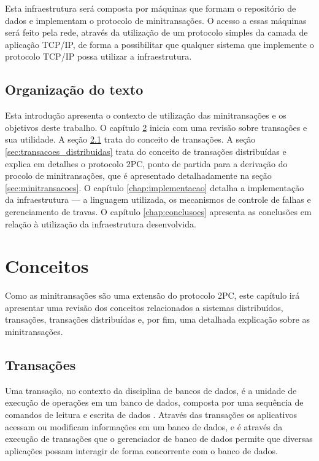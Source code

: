 \documentclass[11pt,twoside,a4paper]{book}
\begin{document}
Esta infraestrutura será composta por máquinas que formam o repositório de dados e implementam o protocolo de minitransações. O acesso a essas máquinas será feito pela rede, através da utilização de um protocolo simples da camada de aplicação TCP/IP, de forma a possibilitar que qualquer sistema que implemente o protocolo TCP/IP possa utilizar a infraestrutura.

\section{Organização do texto}
\label{sec:organizacao_do_texto}
Esta introdução apresenta o contexto de utilização das minitransações e os objetivos deste trabalho. O capítulo \ref{chap:conceitos} inicia com uma revisão sobre transações e sua utilidade. A seção \ref{sec:transacoes} trata do conceito de transações. A seção \ref{sec:transacoes_distribuidas} trata do conceito de transações distribuídas e explica em detalhes o protocolo 2PC, ponto de partida para a derivação do procolo de minitransações, que é apresentado detalhadamente na seção \ref{sec:minitransacoes}. O capítulo \ref{chap:implementacao} detalha a implementação da infraestrutura --- a linguagem utilizada, os mecanismos de controle de falhas e gerenciamento de travas. O capítulo \ref{chap:conclusoes} apresenta as conclusões em relação à utilização da infraestrutura desenvolvida.

\chapter{Conceitos}
\label{chap:conceitos}
Como as minitransações são uma extensão do protocolo 2PC, este capítulo irá apresentar uma revisão dos conceitos relacionados a sistemas distribuídos, transações, transações distribuídas e, por fim, uma detalhada explicação sobre as minitransações.

\section{Transações}
\label{sec:transacoes}
Uma transação, no contexto da disciplina de bancos de dados, é a unidade de execução de operações em um banco de dados, composta por uma sequência de comandos de leitura e escrita de dados \cite{garcia-molina, vaca}. Através das transações os aplicativos acessam ou modificam informações em um banco de dados, e é através da execução de transações que o gerenciador de banco de dados permite que diversas aplicações possam interagir de forma concorrente com o banco de dados.
\end{document}
